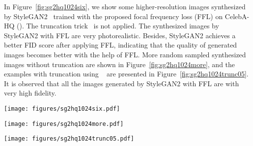 \documentclass[10pt,twocolumn,letterpaper]{article}
\begin{document}
In Figure~\ref{fig:sg2hq1024six}, we show some higher-resolution images synthesized by StyleGAN2~\cite{stylegan2} trained with the proposed focal frequency loss (FFL) on CelebA-HQ (). The truncation trick~\cite{stylegan,stylegan2} is not applied.
The synthesized images by StyleGAN2 with FFL are very photorealistic. Besides, StyleGAN2 achieves a better FID score after applying FFL, indicating that the quality of generated images becomes better with the help of FFL.
More random sampled synthesized images without truncation are shown in Figure~\ref{fig:sg2hq1024more}, and the examples with truncation using ~\cite{stylegan,stylegan2} are presented in Figure~\ref{fig:sg2hq1024trunc05}. It is observed that all the images generated by StyleGAN2 with FFL are with very high fidelity.


\begin{figure*}[t]
	\centering
	\vspace{-0.15cm}
	\texttt{[image: figures/sg2hq1024six.pdf]}
	\vspace{-0.05cm}
	\caption{Synthesis results (without truncation) of StyleGAN2 trained with the proposed FFL on CelebA-HQ (). This model with FFL achieves the FID score of . For reference, the original StyleGAN2 without FFL achieves the FID score of .}
	\label{fig:sg2hq1024six}
\end{figure*}


\begin{figure*}[t]
	\centering
\texttt{[image: figures/sg2hq1024more.pdf]}
\caption{More random sampled images (without truncation) synthesized by StyleGAN2 trained with the proposed FFL on CelebA-HQ ().}
	\label{fig:sg2hq1024more}
\end{figure*}


\begin{figure*}[t]
	\centering
\texttt{[image: figures/sg2hq1024trunc05.pdf]}
\caption{More random sampled images (with truncation applied using ~\cite{stylegan,stylegan2}) synthesized by StyleGAN2 trained with the proposed FFL on CelebA-HQ ().}
	\label{fig:sg2hq1024trunc05}
\end{figure*}
 
\end{document}
